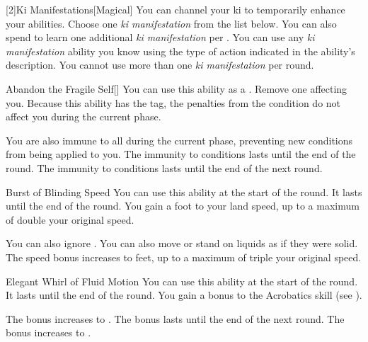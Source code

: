         [2]{Ki Manifestations}[Magical]
        You can channel your ki to temporarily enhance your abilities.
        Choose one \textit{ki manifestation} from the list below.
        You can also spend  to learn one additional \textit{ki manifestation} per .
        You can use any \textit{ki manifestation} ability you know using the type of action indicated in the ability's description.
        You cannot use more than one \textit{ki manifestation} per round.
        {
            \begin{apability}{Abandon the Fragile Self}[]
                You can use this ability as a .
                Remove one  affecting you.
                Because this ability has the  tag, the penalties from the condition do not affect you during the current phase.

                \rankline
                 You are also immune to all  during the current phase, preventing new conditions from being applied to you.
                 The immunity to conditions lasts until the end of the round.
                 The immunity to conditions lasts until the end of the next round.
            \end{apability}

            \begin{apability}{Burst of Blinding Speed}
                You can use this ability at the start of the round.
                It lasts until the end of the round.
                You gain a  foot  to your land speed, up to a maximum of double your original speed.

                \rankline
                 You can also ignore .
                 You can also move or stand on liquids as if they were solid.
                 The speed bonus increases to  feet, up to a maximum of triple your original speed.
            \end{apability}

            \begin{apability}{Elegant Whirl of Fluid Motion}
                You can use this ability at the start of the round.
                It lasts until the end of the round.
                You gain a  bonus to the Acrobatics skill (see ).

                \rankline
                 The bonus increases to .
                 The bonus lasts until the end of the next round.
                 The bonus increases to .
            \end{apability}

}
